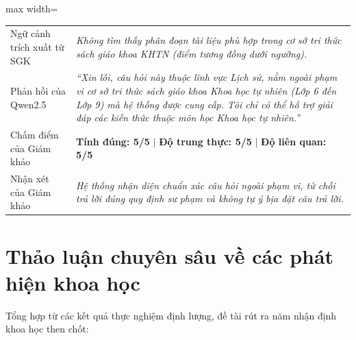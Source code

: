 \begin{table}[H]
\begin{adjustbox}{max width=\textwidth}
\begin{tabular}{p{3.5cm}p{11.5cm}}
Ngữ cảnh trích xuất từ SGK & \textit{Không tìm thấy phân đoạn tài liệu phù hợp trong cơ sở tri thức sách giáo khoa KHTN (điểm tương đồng dưới ngưỡng).} \\
Phản hồi của Qwen2.5 & \textit{``Xin lỗi, câu hỏi này thuộc lĩnh vực Lịch sử, nằm ngoài phạm vi cơ sở tri thức sách giáo khoa Khoa học tự nhiên (Lớp 6 đến Lớp 9) mà hệ thống được cung cấp. Tôi chỉ có thể hỗ trợ giải đáp các kiến thức thuộc môn học Khoa học tự nhiên.''} \\
Chấm điểm của Giám khảo & \textbf{Tính đúng: 5/5} $\mid$ \textbf{Độ trung thực: 5/5} $\mid$ \textbf{Độ liên quan: 5/5} \\
Nhận xét của Giám khảo & \textit{Hệ thống nhận diện chuẩn xác câu hỏi ngoài phạm vi, từ chối trả lời đúng quy định sư phạm và không tự ý bịa đặt câu trả lời.} \\
\bottomrule
\end{tabular}
\end{adjustbox}
\end{table}

\section{Thảo luận chuyên sâu về các phát hiện khoa học}
\label{sec:thaoluan}
Tổng hợp từ các kết quả thực nghiệm định lượng, đề tài rút ra năm nhận định khoa học then chốt:

